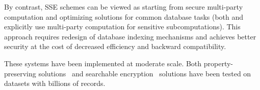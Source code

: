 By contrast, SSE schemes can be viewed as starting from secure multi-party
computation and
optimizing solutions for common database tasks (both \cite{SP:FVKKKM15} and \cite{RSA:IKLO16} explicitly use multi-party computation for sensitive subcomputations). This approach requires redesign
of database indexing mechanisms and achieves better security at the cost of decreased efficiency and backward compatibility. 

These systems have been implemented at moderate scale.  Both property-preserving solutions~\cite{CACM:PRZB12,EPRINT:PodBoePop16} and searchable encryption~\cite{SP:PKVKMC14,SP:FVKKKM15,C:CJJKRS13,CCS:JJKRS13,NDSS:CJJJKR14,ESORICS:FJKNRS15,RSA:IKLO16} solutions have been tested on datasets with billions of records.

%


